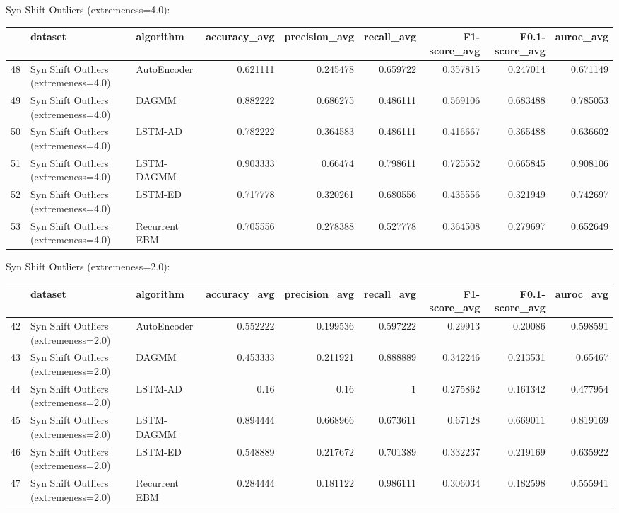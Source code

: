 Syn Shift Outliers (extremeness=4.0):

\begin{tabular}{rllrrrrrr}
\hline
    & dataset                              & algorithm     &   accuracy\_avg &   precision\_avg &   recall\_avg &   F1-score\_avg &   F0.1-score\_avg &   auroc\_avg \\
\hline
 48 & Syn Shift Outliers (extremeness=4.0) & AutoEncoder   &       0.621111 &        0.245478 &     0.659722 &       0.357815 &         0.247014 &    0.671149 \\
 49 & Syn Shift Outliers (extremeness=4.0) & DAGMM         &       0.882222 &        0.686275 &     0.486111 &       0.569106 &         0.683488 &    0.785053 \\
 50 & Syn Shift Outliers (extremeness=4.0) & LSTM-AD       &       0.782222 &        0.364583 &     0.486111 &       0.416667 &         0.365488 &    0.636602 \\
 51 & Syn Shift Outliers (extremeness=4.0) & LSTM-DAGMM    &       0.903333 &        0.66474  &     0.798611 &       0.725552 &         0.665845 &    0.908106 \\
 52 & Syn Shift Outliers (extremeness=4.0) & LSTM-ED       &       0.717778 &        0.320261 &     0.680556 &       0.435556 &         0.321949 &    0.742697 \\
 53 & Syn Shift Outliers (extremeness=4.0) & Recurrent EBM &       0.705556 &        0.278388 &     0.527778 &       0.364508 &         0.279697 &    0.652649 \\
\hline
\end{tabular}

Syn Shift Outliers (extremeness=2.0):

\begin{tabular}{rllrrrrrr}
\hline
    & dataset                              & algorithm     &   accuracy\_avg &   precision\_avg &   recall\_avg &   F1-score\_avg &   F0.1-score\_avg &   auroc\_avg \\
\hline
 42 & Syn Shift Outliers (extremeness=2.0) & AutoEncoder   &       0.552222 &        0.199536 &     0.597222 &       0.29913  &         0.20086  &    0.598591 \\
 43 & Syn Shift Outliers (extremeness=2.0) & DAGMM         &       0.453333 &        0.211921 &     0.888889 &       0.342246 &         0.213531 &    0.65467  \\
 44 & Syn Shift Outliers (extremeness=2.0) & LSTM-AD       &       0.16     &        0.16     &     1        &       0.275862 &         0.161342 &    0.477954 \\
 45 & Syn Shift Outliers (extremeness=2.0) & LSTM-DAGMM    &       0.894444 &        0.668966 &     0.673611 &       0.67128  &         0.669011 &    0.819169 \\
 46 & Syn Shift Outliers (extremeness=2.0) & LSTM-ED       &       0.548889 &        0.217672 &     0.701389 &       0.332237 &         0.219169 &    0.635922 \\
 47 & Syn Shift Outliers (extremeness=2.0) & Recurrent EBM &       0.284444 &        0.181122 &     0.986111 &       0.306034 &         0.182598 &    0.555941 \\
\hline
\end{tabular}

